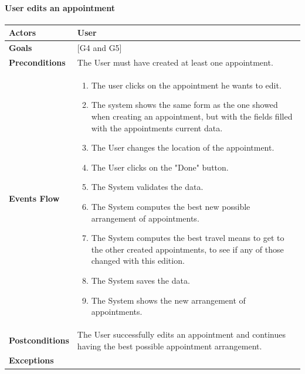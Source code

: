 \documentclass[12pt]{article}
\begin{document}
\newpage

\paragraph{User edits an appointment}

\begin{center}
    \begin{tabular} { |p{}|p{}| }
        \hline
        \textbf{Actors} & User \\ 
        \hline
        \textbf{Goals} & {[G4 and G5]} \\ 
        \hline  
        \textbf{Preconditions} & The User must have created at least one appointment. \\ 
        \hline
        \textbf{Events Flow} & \begin{enumerate}[topsep=0pt] 
                            \setlength{\itemsep}{0.5pt}
                            \item The user clicks on the appointment he wants to edit.
                            \item The system shows the same form as the one showed when creating an appointment, but with the fields filled with the appointments current data.
                            \item The User changes the location of the appointment.
                            \item The User clicks on the "Done" button.
                            \item The System validates the data.
                            \item The System computes the best new possible arrangement of appointments.
                            \item The System computes the best travel means to get to the other created appointments, to see if any of those changed with this edition.
                            \item The System saves the data.
                            \item The System shows the new arrangement of appointments.
                            \end{enumerate} \\
        \hline
        \textbf{Postconditions} & The User successfully edits an appointment and continues having the best possible appointment arrangement. \\
        \hline
        \textbf{Exceptions} & \begin{enumerate}[topsep=0pt] 

\end{enumerate}
\end{tabular}
\end{center}
\end{document}

